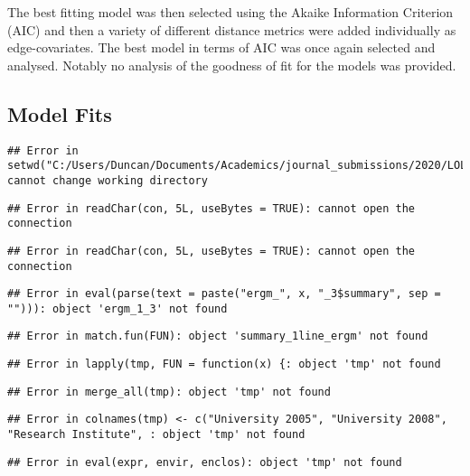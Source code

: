 \documentclass[
]{statsoc}
\begin{document}
The best fitting model was then selected using the Akaike Information
Criterion (AIC) and then a variety of different distance metrics were
added individually as edge-covariates. The best model in terms of AIC
was once again selected and analysed. Notably no analysis of the
goodness of fit for the models was provided.

\subsection{Model Fits}

\begin{verbatim}
## Error in setwd("C:/Users/Duncan/Documents/Academics/journal_submissions/2020/LOLOG_Catalog/1_18_OfficeLayout"): cannot change working directory
\end{verbatim}

\begin{verbatim}
## Error in readChar(con, 5L, useBytes = TRUE): cannot open the connection
\end{verbatim}

\begin{verbatim}
## Error in readChar(con, 5L, useBytes = TRUE): cannot open the connection
\end{verbatim}

\begin{verbatim}
## Error in eval(parse(text = paste("ergm_", x, "_3$summary", sep = ""))): object 'ergm_1_3' not found
\end{verbatim}

\begin{verbatim}
## Error in match.fun(FUN): object 'summary_1line_ergm' not found
\end{verbatim}

\begin{verbatim}
## Error in lapply(tmp, FUN = function(x) {: object 'tmp' not found
\end{verbatim}

\begin{verbatim}
## Error in merge_all(tmp): object 'tmp' not found
\end{verbatim}

\begin{verbatim}
## Error in colnames(tmp) <- c("University 2005", "University 2008", "Research Institute", : object 'tmp' not found
\end{verbatim}

\begin{verbatim}
## Error in eval(expr, envir, enclos): object 'tmp' not found
\end{verbatim}
\end{document}
